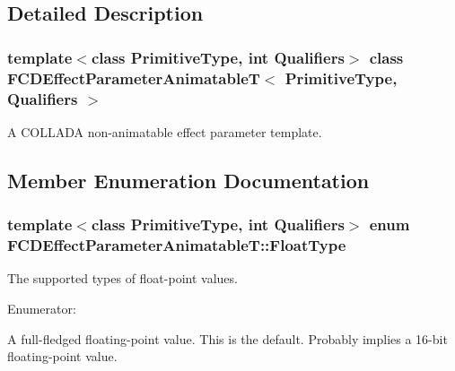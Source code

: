 \subsection{Detailed Description}
\subsubsection*{template$<$class PrimitiveType, int Qualifiers$>$ class FCDEffectParameterAnimatableT$<$ PrimitiveType, Qualifiers $>$}

A COLLADA non-\/animatable effect parameter template. 

\subsection{Member Enumeration Documentation}
\hypertarget{classFCDEffectParameterAnimatableT_a8cc624ded1c773fd65851d213573e8b1}{
\subsubsection[{FloatType}]{\setlength{\rightskip}{0pt plus 5cm}template$<$class PrimitiveType, int Qualifiers$>$ enum {\bf FCDEffectParameterAnimatableT::FloatType}}}
\label{classFCDEffectParameterAnimatableT_a8cc624ded1c773fd65851d213573e8b1}
The supported types of float-\/point values. \begin{Desc}
\item[Enumerator: ]\par
\begin{description}
\item[{\em 
\hypertarget{classFCDEffectParameterAnimatableT_a8cc624ded1c773fd65851d213573e8b1a0f1f9490970710f8c80173b3d8fa37ff}{
HALF}
\label{classFCDEffectParameterAnimatableT_a8cc624ded1c773fd65851d213573e8b1a0f1f9490970710f8c80173b3d8fa37ff}
}]A full-\/fledged floating-\/point value. This is the default. Probably implies a 16-\/bit floating-\/point value. \end{description}
\end{Desc}




